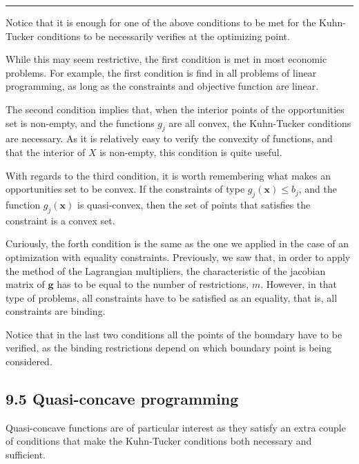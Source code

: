 \documentclass[0pt, a4paper]{article}
\begin{document}
\noindent\rule{\textwidth}{1pt}

Notice that it is enough for one of the above conditions to be met for the Kuhn-Tucker conditions to be necessarily verifies at the optimizing point.

While this may seem restrictive, the first condition is met in most economic problems. For example, the first condition is find in all problems of linear programming, as long as the constraints and objective function are linear.

The second condition implies that, when the interior points of the opportunities set is non-empty, and the functions $g_j$ are all convex, the Kuhn-Tucker conditions are necessary. As it is relatively easy to verify the convexity of functions, and that the interior of $X$ is non-empty, this condition is quite useful.

With regards to the third condition, it is worth remembering what makes an opportunities set to be convex. If the constraints of type $g_j(\textbf{x})\leq b_j$, and the function $g_j(\textbf{x})$ is quasi-convex, then the set of points that satisfies the constraint is a convex set.

Curiously, the forth condition is the same as the one we applied in the case of an optimization with equality constraints. Previously, we saw that, in order to apply the method of the Lagrangian multipliers, the characteristic of the jacobian matrix of $\textbf{g}$ has to be equal to the number of restrictions, $m$. However, in that type of problems, all constraints have to be satisfied as an equality, that is, all constraints are binding.

Notice that in the last two conditions all the points of the boundary have to be verified, as the binding restrictions depend on which boundary point is being considered.

\subsection*{9.5 Quasi-concave programming}

Quasi-concave functions are of particular interest as they satisfy an extra couple of conditions that make the Kuhn-Tucker conditions both necessary and sufficient.
\end{document}
